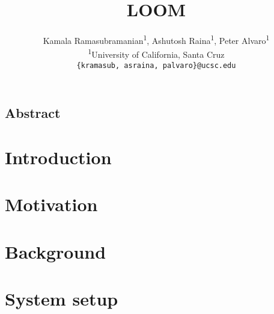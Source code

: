\documentclass[letterpaper,twocolumn,10pt]{article}
\newcommand*{\affaddr}[1]{#1} %
\newcommand*{\affmark}[1][*]{\textsuperscript{#1}}
\newcommand*{\email}[1]{\texttt{#1}}
\begin{document}
\date{}

\title{\Large \bf LOOM}

\author{
Kamala Ramasubramanian\affmark[1], Ashutosh Raina\affmark[1], Peter Alvaro\affmark[1]\\
\affaddr{\affmark[1]University of California, Santa Cruz}\\
\email{\{kramasub, asraina, palvaro\}@ucsc.edu}
}

\maketitle


\subsection*{Abstract}


\section{Introduction}


\section{Motivation}
\label{sec:motivation}


\section{Background}




\section{System setup}


\end{document}

